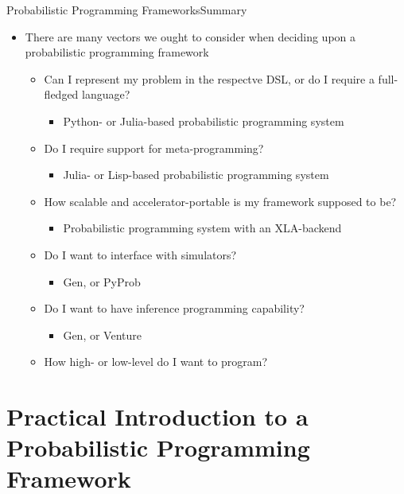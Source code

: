 \documentclass[AERbeamer%
              ,optEnglish%
              ,optBiber%
              ,optBibstyleAlphabetic%
              ,optBeamerClassicFormat%
              ]{AERlatex}%
\begin{document}
\begin{frame}[c]{Probabilistic Programming Frameworks}{Summary}
    \centering
    \begin{itemize}
        \item There are many vectors we ought to consider when deciding upon a probabilistic programming framework
        \begin{itemize}
            \item Can I represent my problem in the respectve DSL, or do I require a full-fledged language?
            \begin{itemize}
                \item Python- or Julia-based probabilistic programming system
            \end{itemize}
            \item Do I require support for meta-programming?
            \begin{itemize}
                \item Julia- or Lisp-based probabilistic programming system
            \end{itemize}
            \item How scalable and accelerator-portable is my framework supposed to be?
            \begin{itemize}
                \item Probabilistic programming system with an XLA-backend
            \end{itemize}
            \item Do I want to interface with simulators?
            \begin{itemize}
                \item Gen, or PyProb
            \end{itemize}
            \item Do I want to have inference programming capability?
            \begin{itemize}
                \item Gen, or Venture
            \end{itemize}
            \item How high- or low-level do I want to program?
        \end{itemize}
    \end{itemize}
\end{frame}



\section{Practical Introduction to a Probabilistic Programming Framework}
\end{document}
